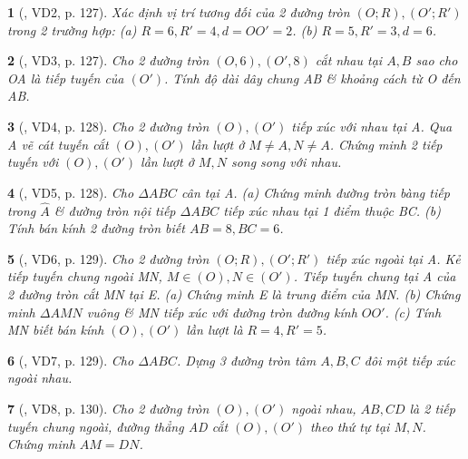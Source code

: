 \documentclass{article}
\newtheorem{baitoan}{}
\begin{document}
\begin{baitoan}[\cite{Binh_boi_duong_Toan_9_tap_1}, VD2, p. 127]
	Xác định vị trí tương đối của 2 đường tròn $(O;R),(O';R')$ trong 2 trường hợp: (a) $R = 6,R' = 4,d = OO' = 2$. (b) $R = 5,R' = 3,d = 6$.
\end{baitoan}

\begin{baitoan}[\cite{Binh_boi_duong_Toan_9_tap_1}, VD3, p. 127]
	Cho 2 đường tròn $(O,6),(O',8)$ cắt nhau tại $A,B$ sao cho OA là tiếp tuyến của $(O')$. Tính độ dài dây chung AB \& khoảng cách từ O đến AB.
\end{baitoan}

\begin{baitoan}[\cite{Binh_boi_duong_Toan_9_tap_1}, VD4, p. 128]
	 Cho 2 đường tròn $(O),(O')$ tiếp xúc với nhau tại A. Qua A vẽ cát tuyến cắt $(O),(O')$ lần lượt ở $M\ne A,N\ne A$. Chứng minh 2 tiếp tuyến với $(O),(O')$ lần lượt ở $M,N$ song song với nhau.
\end{baitoan}

\begin{baitoan}[\cite{Binh_boi_duong_Toan_9_tap_1}, VD5, p. 128]
	Cho $\Delta ABC$ cân tại A. (a) Chứng minh đường tròn bàng tiếp trong $\widehat{A}$ \& đường tròn nội tiếp $\Delta ABC$ tiếp xúc nhau tại 1 điểm thuộc BC. (b) Tính bán kính 2 đường tròn biết $AB = 8,BC = 6$.
\end{baitoan}

\begin{baitoan}[\cite{Binh_boi_duong_Toan_9_tap_1}, VD6, p. 129]
	Cho 2 đường tròn $(O;R),(O';R')$ tiếp xúc ngoài tại A. Kẻ tiếp tuyến chung ngoài MN, $M\in(O),N\in(O')$. Tiếp tuyến chung tại A của 2 đường tròn cắt MN tại E. (a) Chứng minh E là trung điểm của MN. (b) Chứng minh $\Delta AMN$ vuông \& MN tiếp xúc với đường tròn đường kính $OO'$. (c) Tính MN biết bán kính $(O),(O')$ lần lượt là $R = 4,R' = 5$.
\end{baitoan}

\begin{baitoan}[\cite{Binh_boi_duong_Toan_9_tap_1}, VD7, p. 129]
	Cho $\Delta ABC$. Dựng 3 đường tròn tâm $A,B,C$ đôi một tiếp xúc ngoài nhau.
\end{baitoan}

\begin{baitoan}[\cite{Binh_boi_duong_Toan_9_tap_1}, VD8, p. 130]
	Cho 2 đường tròn $(O),(O')$ ngoài nhau, $AB,CD$ là 2 tiếp tuyến chung ngoài, đường thẳng AD cắt $(O),(O')$ theo thứ tự tại $M,N$. Chứng minh $AM = DN$.
\end{baitoan}
\end{document}

